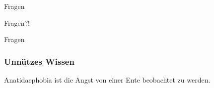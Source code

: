 \documentclass{beamer}
\begin{document}
\begin{frame}{Fragen}
	\begin{center}
		Fragen?!
	\end{center}
\end{frame}

\begin{frame}{Fragen}
	\frametitle{Unnützes Wissen}
	\begin{center}
		Anatidaephobia ist die Angst von einer Ente beobachtet zu werden.
	\end{center}
\end{frame}
\end{document}
